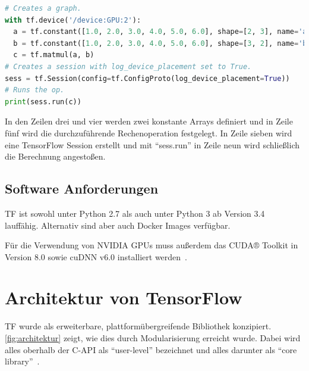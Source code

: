 \begin{minipage}{\linewidth}
\begin{lstlisting}[language=Python, label=lst:tf-dev, caption={Festlegung des Geräts, auf dem die Berechnung getätigt werden soll}]
# Creates a graph.
with tf.device('/device:GPU:2'):
  a = tf.constant([1.0, 2.0, 3.0, 4.0, 5.0, 6.0], shape=[2, 3], name='a')
  b = tf.constant([1.0, 2.0, 3.0, 4.0, 5.0, 6.0], shape=[3, 2], name='b')
  c = tf.matmul(a, b)
# Creates a session with log_device_placement set to True.
sess = tf.Session(config=tf.ConfigProto(log_device_placement=True))
# Runs the op.
print(sess.run(c))
\end{lstlisting}
\end{minipage}

In den Zeilen drei und vier werden zwei konstante Arrays definiert und in Zeile fünf wird die durchzuführende Rechenoperation festgelegt. In Zeile sieben wird eine TensorFlow Session erstellt und mit "`sess.run"' in Zeile neun wird schließlich die Berechnung angestoßen.

\subsection{Software Anforderungen}
\Gls{TF} ist sowohl unter Python 2.7 als auch unter Python 3 ab Version 3.4~\cite{tfinstall} lauffähig. Alternativ sind aber auch Docker Images verfügbar.

Für die Verwendung von NVIDIA GPUs muss außerdem das CUDA® Toolkit in Version 8.0 	sowie cuDNN v6.0 installiert werden~\cite{tfinstall}.

\section{Architektur von TensorFlow}
\Gls{TF} wurde als erweiterbare, plattformübergreifende Bibliothek konzipiert. \autoref{fig:architektur} zeigt, wie dies durch Modularisierung erreicht wurde. Dabei wird alles oberhalb der C-API als "`user-level"' bezeichnet und alles darunter als "`core library"'~\cite{tensorflow2016-whitepaper}.



